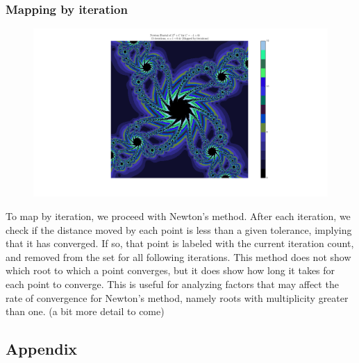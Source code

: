 \documentclass[12pt]{article}
\begin{document}
\begin{onehalfspace}
\subsubsection*{Mapping by iteration}
\begin{figure}[H]
	\centering
	\includegraphics[width=0.7\linewidth]{images/goodImage3}
	\caption{}
	\label{fig:rootEx2}
\end{figure}
To map by iteration, we proceed with Newton’s method.  After each iteration, we check if the distance moved by each point is less than a given tolerance, implying that it has converged.  If so, that point is labeled with the current iteration count, and removed from the set for all following iterations. This method does not show which root to which a point converges, but it does show how long it takes for each point to converge.  This is useful for analyzing factors that may affect the rate of convergence for Newton’s method, namely roots with multiplicity greater than one. (a bit more detail to come)

\end{onehalfspace}
\pagebreak
\normalsize
\begin{center}
	\section*{Appendix}
\end{center}
\end{document}
